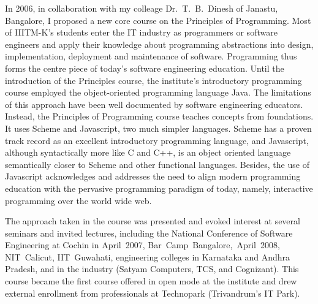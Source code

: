 \documentclass[titlepage, %
11pt, 
]{article}
\begin{document}
In 2006, in collaboration with my colleage Dr.~T.~B.~Dinesh
of Janastu, Bangalore, I proposed a new core course on the
Principles of Programming.  Most of IIITM-K's students enter
the IT industry as programmers or software engineers and
apply their knowledge about programming abstractions into
design, implementation, deployment and maintenance of
software.  Programming thus forms the centre piece of
today's software engineering education.  Until the
introduction of the Principles course, the institute's
introductory programming course employed the object-oriented
programming language Java.  The limitations of this approach
have been well documented by software engineering educators.
Instead, the Principles of Programming course teaches
concepts from foundations.  It uses Scheme and Javascript,
two much simpler languages.  Scheme has a proven track
record as an excellent introductory programming language,
and Javascript, although syntactically more like C and C++,
is an object oriented language semantically closer to Scheme
and other functional languages.  Besides, the use of
Javascript acknowledges and addresses the need to align
modern programming education with the pervasive programming
paradigm of today, namely, interactive programming over the
world wide web.

The approach taken in the course was presented and evoked
interest at several seminars and invited lectures, including
the National Conference of Software Engineering at Cochin in
April~2007, Bar~Camp~Bangalore,~April~2008, NIT~Calicut,
IIT~Guwahati, engineering colleges in Karnataka and Andhra
Pradesh, and in the industry (Satyam Computers, TCS, and
Cognizant).  This course became the first course offered in
open mode at the institute and drew external enrollment from
professionals at Technopark (Trivandrum's IT Park).
\end{document}
